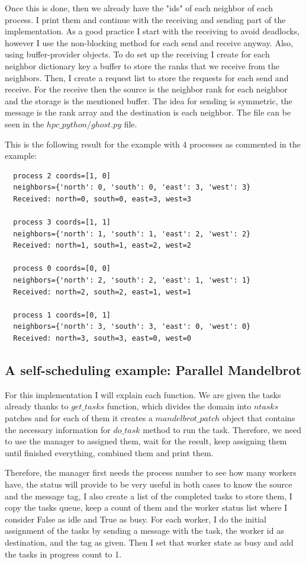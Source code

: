 \documentclass[unicode,11pt,a4paper,oneside,numbers=endperiod,openany]{scrartcl}
\begin{document}
Once this is done, then we already have the "ids" of each neighbor of each process. I print them and continue with the receiving and sending part of the implementation. 
As a good practice I start with the receiving to avoid deadlocks, however I use the non-blocking method for each send and receive anyway. Also, using buffer-provider objects.
To do set up the receiving I create for each neighbor dictionary key a buffer to store the ranks that we receive from the neighbors. Then, I create a request list to store the requests for each send and receive.
For the receive then the source is the neighbor rank for each neighbor and the storage is the mentioned buffer. 
The idea for sending is symmetric, the message is the rank array and the destination is each neighbor. The file can be seen in the $hpc\_python/ghost.py$ file.

This is the following result for the example with 4 processes as commented in the example:

\begin{verbatim}
  process 2 coords=[1, 0] 
  neighbors={'north': 0, 'south': 0, 'east': 3, 'west': 3}
  Received: north=0, south=0, east=3, west=3
  
  process 3 coords=[1, 1]
  neighbors={'north': 1, 'south': 1, 'east': 2, 'west': 2}
  Received: north=1, south=1, east=2, west=2
  
  process 0 coords=[0, 0]
  neighbors={'north': 2, 'south': 2, 'east': 1, 'west': 1}
  Received: north=2, south=2, east=1, west=1
  
  process 1 coords=[0, 1]
  neighbors={'north': 3, 'south': 3, 'east': 0, 'west': 0}
  Received: north=3, south=3, east=0, west=0
  \end{verbatim}

\subsection{A self-scheduling example: Parallel Mandelbrot}
For this implementation I will explain each function. We are given the tasks 
already thanks to $get\_tasks$ function, which divides the domain into $ntasks$
patches and for each of them it creates a $mandelbrot\_patch$ object that contains the necessary information
for $do\_task$ method to run the task. Therefore, we need to use the manager to assigned them, wait for the result, 
keep assigning them until finished everything, combined them and print them. 

Therefore, the manager first needs the process number to see how many workers have, 
the status will provide to be very useful in both cases to know the source and the message tag, 
I also create a list of the completed tasks to store them, I copy the tasks queue, keep a count of them and the worker status list where
I consider False as idle and True as busy. For each worker, I do the initial assignment of the tasks by sending a message with the task, the 
worker id as destination, and the tag as given. Then I set that worker state as busy and add the tasks in progress count to 1. 
\end{document}

